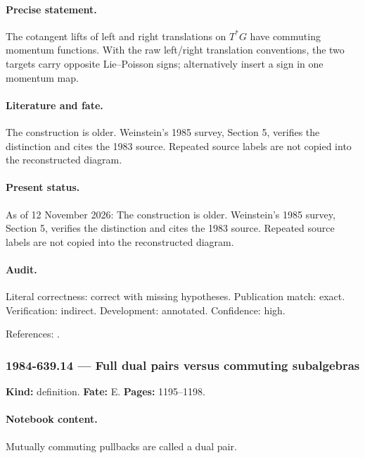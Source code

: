 \paragraph{Precise statement.} The cotangent lifts of left and right translations on \(T^*G\) have commuting momentum functions. With the raw left/right translation conventions, the two targets carry opposite Lie--Poisson signs; alternatively insert a sign in one momentum map.

\paragraph{Literature and fate.} The construction is older. Weinstein's 1985 survey, Section 5, verifies the distinction and cites the 1983 source. Repeated source labels are not copied into the reconstructed diagram.

\paragraph{Present status.} As of 12 November 2026: The construction is older. Weinstein's 1985 survey, Section 5, verifies the distinction and cites the 1983 source. Repeated source labels are not copied into the reconstructed diagram.

\paragraph{Audit.} Literal correctness: correct with missing hypotheses. Publication match: exact. Verification: indirect. Development: annotated. Confidence: high.

\noindent References: \citep{weinstein1983local,weinstein1985poisson}.\par

\subsubsection{1984-639.14 --- Full dual pairs versus commuting subalgebras}

\label{item:1984-639.14}

\noindent\textbf{Kind:} definition. \textbf{Fate:} E. \textbf{Pages:} 1195--1198.\par

\paragraph{Notebook content.} Mutually commuting pullbacks are called a dual pair.

